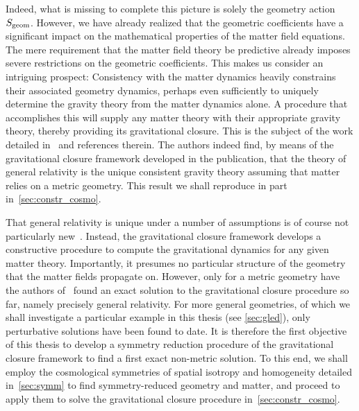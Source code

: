
Indeed, what is missing to complete this picture is solely the geometry action~$S_\mathrm{geom}$. However, we have already realized that the geometric coefficients have a significant impact on the mathematical properties of the matter field equations. The mere requirement that the matter field theory be predictive already imposes severe restrictions on the geometric coefficients. This makes us consider an intriguing prospect: Consistency with the matter dynamics heavily constrains their associated geometry dynamics, perhaps even sufficiently to uniquely determine the gravity theory from the matter dynamics alone. A procedure that accomplishes this will supply any matter theory with their appropriate gravity theory, thereby providing its gravitational closure. This is the subject of the work detailed in~\autocite{Schuller2016} and references therein. The authors indeed find, by means of the gravitational closure framework developed in the publication, that the theory of general relativity is the unique consistent gravity theory assuming that matter relies on a metric geometry. This result we shall reproduce in part in~\autoref{sec:constr_cosmo}.

That general relativity is unique under a number of assumptions is of course not particularly new~\autocite{Lovelock1971,Navarro2011}. Instead, the gravitational closure framework develops a constructive procedure to compute the gravitational dynamics for any given matter theory. Importantly, it presumes no particular structure of the geometry that the matter fields propagate on. However, only for a metric geometry have the authors of~\autocite{Schuller2016} found an exact solution to the gravitational closure procedure so far, namely precisely general relativity. For more general geometries, of which we shall investigate a particular example in this thesis (see \autoref{sec:gled}), only perturbative solutions have been found to date. It is therefore the first objective of this thesis to develop a symmetry reduction procedure of the gravitational closure framework to find a first exact non-metric solution. To this end, we shall employ the cosmological symmetries of spatial isotropy and homogeneity detailed in~\autoref{sec:symm} to find symmetry-reduced geometry and matter, and proceed to apply them to solve the gravitational closure procedure in~\autoref{sec:constr_cosmo}.

